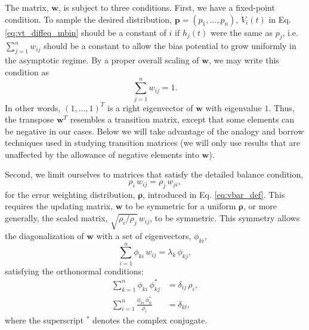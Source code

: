 \documentclass[reprint, superscriptaddress, floatfix]{revtex4-1}
\begin{document}
The matrix, $\mathbf w$, is subject to three conditions.
%
First, we have a fixed-point condition\cite{bussi2006, dama2014}.
%
To sample the desired distribution,
$\mathbf p = (p_1, \dots, p_n)$,
${\dot V}_i(t)$
in Eq. \eqref{eq:vt_diffeq_mbin}
should be a constant of $i$
if $h_j(t)$ were the same as $p_j$,
i.e.
$\sum_{j=1}^n w_{ij}$ should be a constant
to allow the bias potential to grow uniformly
in the asymptotic regime.
%
By a proper overall scaling of $\mathbf w$,
we may write this condition as
%
\begin{equation}
  \sum_{j = 1}^n w_{ij} = 1
  .
\label{eq:w_sumj}
\end{equation}
%
In other words, $(1, \dots, 1)^T$
is a right eigenvector of $\mathbf w$
with eigenvalue $1$.
%
Thus, the transpose $\mathbf w^T$
resembles a transition matrix,
except that some elements can be negative
in our cases.
%
Below we will take advantage of the analogy
and borrow techniques used
in studying transition matrices\cite{vankampen}
(we will only use results that are unaffected by the allowance
of negative elements into $\mathbf w$).


Second, we limit ourselves to matrices %
that satisfy
the detailed balance condition,
%
\begin{equation}
  \rho_i \, w_{ij} = \rho_j \, w_{ji}
  ,
  \label{eq:w_detailedbalance}
\end{equation}
%
for the error weighting distribution, $\pmb \rho$,
introduced in Eq. \eqref{eq:vbar_def}.
%
This requires the updating matrix, $\mathbf w$
to be symmetric
for a uniform $\pmb\rho$,
or more generally,
the scaled matrix, $\sqrt{ \rho_i/\rho_j } \, w_{ij}$,
to be symmetric.
%
This symmetry allows the diagonalization
of $\mathbf w$ with a set of
eigenvectors, $\phi_{ki}$,
%
\begin{equation}
  \sum_{i = 1}^n \phi_{ki} \, w_{ij}
  =
  \lambda_k \, \phi_{kj}
  ,
\label{eq:eig_w}
\end{equation}
%
satisfying the orthonormal conditions\cite{vankampen}:
%
\begin{align}
  \sum_{k = 1}^n
    \phi_{ki} \, \phi_{kj}^*
  &=
  \delta_{ij} \, \rho_i,
  \label{eq:eig_orthonormal_cols}
  \\
  \sum_{i = 1}^n
    \frac{ \phi_{ki} \, \phi_{li}^* }
         { \rho_i }
  &=
  \delta_{kl}
  ,
  \label{eq:eig_orthonormal_rows}
\end{align}
%
where the superscript $^*$
denotes the complex conjugate.
\end{document}
